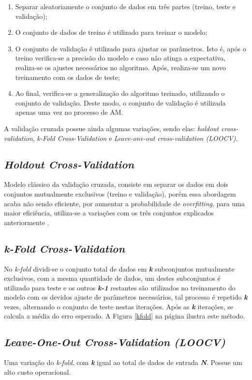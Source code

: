 \begin{enumerate}
    \item Separar aleatoriamente o conjunto de dados em três partes (treino, teste e validação);
    \item O conjunto de dados de treino é utilizado para treinar o modelo;
    \item O conjunto de validação é utilizado para ajustar os parâmetros. Isto é, após o treino verifica-se a precisão do modelo e caso não atinga a expectativa, realiza-se os ajustes necessários no algoritmo. Após, realiza-se um novo treinamento com os dados de teste;
    \item Ao final, verifica-se a generalização do algoritmo treinado, utilizando o conjunto de validação. Deste modo, o conjunto de validação é utilizada apenas uma vez no processo de AM.
\end{enumerate}

A validação cruzada possue ainda algumas variações, sendo elas: \textit{holdout cross-validation}, \textit{k-Fold Cross-Validation} e \textit{Leave-one-out cross-validation (LOOCV)}.


\subsection{\textit{Holdout Cross-Validation}}
Modelo clássico da validação cruzada, consiste em separar os dados em dois conjuntos mutualmente exclusivos (treino e validação), porém essa abordagem acaba não sendo eficiente, por aumentar a probabilidade de \textit{overfitting}, para uma maior eficiência, utiliza-se a variações com os três conjuntos explicados anteriormente \cite{raschka2015python}.

\subsection{\textit{k-Fold Cross-Validation}}
No \textit{k-fold} dividi-se o conjunto total de dados em \textbf{\textit{k}} subconjuntos mutualmente exclusivos, com a mesma quantidade de dados, um destes subconjuntos é utilizado para teste e os outros \textbf{\textit{k-1}} restantes são utilizados no treinamento do modelo com os devidos ajuste de parâmetros necessários, tal processo é repetido \textbf{\textit{k}} vezes, alternando o conjunto de teste nestas iterações. Após as \textbf{\textit{k}} iterações, se calcula a média do erro esperado. A Figura \ref{kfold} na página \pageref{kfold} ilustra este método.

\subsection{\textit{Leave-One-Out Cross-Validation (LOOCV)}} Uma variação do \textit{k-fold}, com \textbf{\textit{k}} igual ao total de dados de entrada \textbf{\textit{N}}. Possue um alto custo operacional.


